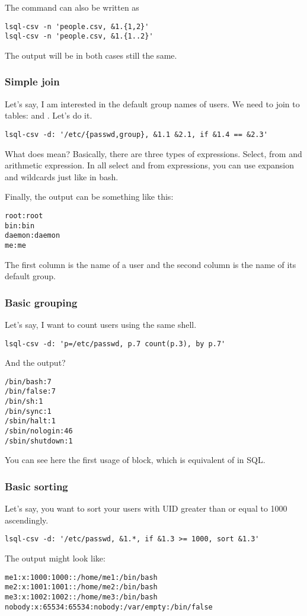 The command can also be written as
\begin{verbatim}
lsql-csv -n 'people.csv, &1.{1,2}'
lsql-csv -n 'people.csv, &1.{1..2}'
\end{verbatim}
The output will be in both cases still the same.


\subsubsection{Simple join}
Let's say, I am interested in the default group names of users. We need to join to tables:  and . Let's do it.
\begin{verbatim}
lsql-csv -d: '/etc/{passwd,group}, &1.1 &2.1, if &1.4 == &2.3'
\end{verbatim}
What does  mean? Basically, there are three types of expressions. Select, from and arithmetic expression. In all select and from expressions, you can use expansion and wildcards just like in bash\cite{bash-reference-manual}.

Finally, the output can be something like this:
\begin{verbatim}
root:root
bin:bin
daemon:daemon
me:me
\end{verbatim}
The first column is the name of a user and the second column is the name of its default group.


\subsubsection{Basic grouping}
Let's say, I want to count users using the same shell.
\begin{verbatim}
lsql-csv -d: 'p=/etc/passwd, p.7 count(p.3), by p.7'
\end{verbatim}
And the output?
\begin{verbatim}
/bin/bash:7
/bin/false:7
/bin/sh:1
/bin/sync:1
/sbin/halt:1
/sbin/nologin:46
/sbin/shutdown:1
\end{verbatim}

You can see here the first usage of  block, which is equivalent of  in SQL.

\subsubsection{Basic sorting}
Let's say, you want to sort your users with UID greater than or equal to 1000 ascendingly.
\begin{verbatim}
lsql-csv -d: '/etc/passwd, &1.*, if &1.3 >= 1000, sort &1.3'
\end{verbatim}
The output might look like:
\begin{verbatim}
me1:x:1000:1000::/home/me1:/bin/bash
me2:x:1001:1001::/home/me2:/bin/bash
me3:x:1002:1002::/home/me3:/bin/bash
nobody:x:65534:65534:nobody:/var/empty:/bin/false
\end{verbatim}

